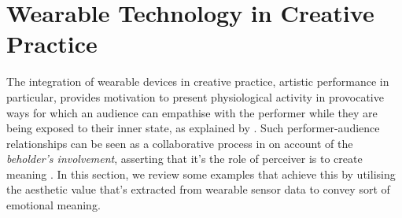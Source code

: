 

\section{Wearable Technology in Creative Practice}%
\label{lit_review:biosignals_creativity}

The integration of wearable devices in creative practice, artistic performance in particular, provides motivation to present physiological activity in provocative ways for which an audience can empathise with the performer while they are being exposed to their inner state, as explained by \citeauthor{francoise_designing_2017} \cite{francoise_designing_2017}. Such performer-audience relationships can be seen as a collaborative process in on account of the \textit{beholder's involvement}, asserting that it's the role of perceiver is to create meaning \cite{kandel_age_2012}. In this section, we review some examples that achieve this by utilising the aesthetic value that's extracted from wearable sensor data to convey sort of emotional meaning. 


